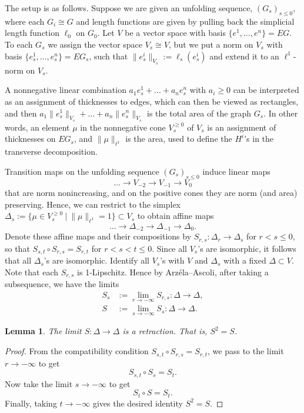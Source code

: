 \documentclass[11pt, letterpaper]{amsart}
\theoremstyle{plain}
\newtheorem{lemma}[theorem]{Lemma}
\theoremstyle{definition}
\begin{document}
The setup is as follows.
Suppose we are given an unfolding sequence, $(G_s)_{s \le 0}$, where each $G_i \cong G$ and
length functions are given by pulling back the simplicial length function
$\ell_0$ on $G_0$.
Let $V$ be a vector space with basis $\{e^1,\ldots,e^n\}=EG$.
To each $G_s$ we assign the vector space $V_s \cong V$, but we put a norm on $V_s$
with basis $\{e_s^1,\ldots,e_s^n\}=EG_s$, such that $\| e^i_s \|_{V_s}:= \ell_{s}(e^i_s)$ and extend it to an $\ell^1$-norm on
$V_s$.

A nonnegative linear combination $a_1e^{1}_s+\ldots + a_ne^{n}_s$ with $a_i \ge 0$
can be interpreted as an assignment of thicknesses to edges, which can
then be viewed as rectangles, and then
$a_1\|e^{1}_s\|_{V_s}+\ldots+a_n\|e^{n}_s\|_{V_s}$ is the total area of the graph $G_s$. In other words,
an element $\mu$ in the nonnegative cone $V_s^{\ge 0}$ of $V_s$ is an assignment of thicknesses
on $EG_s$,
and $\|\mu\|_{\ell^1}$ is the area, used to define the $H^i$'s in the transverse decomposition.

Transition maps on the unfolding sequence $(G_s)_{s\le 0}$ induce linear maps
\[
  \ldots \longrightarrow V_{-2} \longrightarrow V_{-1} \longrightarrow V_0
\]
that are norm nonincreasing, and on the positive cones they are
norm (and area) preserving.
Hence, we can restrict to the simplex $\Delta_s:=\{\mu \in V_s^{\ge 0}\ |\ \|\mu\|_{\ell^1}=1\} \subset V_s$ to obtain
affine maps
\[
  \ldots \longrightarrow \Delta_{-2} \longrightarrow \Delta_{-1} \longrightarrow \Delta_0.
\]
Denote these affine maps and their compositions by $S_{r,s}:\Delta_r \to \Delta_s$
for $r < s \le 0$,
so that $S_{s,t}\circ S_{r,s} = S_{r,t}$ for $r < s < t \le 0$. Since all $V_s$'s are isomorphic, it
follows that all $\Delta_s$'s are isomorphic. Identify all $V_s$'s with $V$ and $\Delta_s$ with a
fixed $\Delta \subset V$. Note that each $S_{r,s}$ is 1-Lipschitz. Hence by Arz{\'e}la--Ascoli, after taking a
subsequence, we have the limits
\begin{align*}
  S_s &:= \lim_{r \to -\infty} S_{r,s}:\Delta \to \Delta,\\
  S &:= \lim_{s \to -\infty} S_{s}: \Delta \to \Delta.
\end{align*}
\begin{lemma}\label{lem:S_Retraction}
  The limit $S:\Delta \to \Delta$ is a retraction. That is, $S^2=S$.
\end{lemma}
\begin{proof}
  From the compatibility condition $S_{s,t}\circ S_{r,s} = S_{r,t}$, we pass to the
  limit $r \to -\infty$ to get
  \[
    S_{s,t} \circ S_{s} = S_{t}.
  \]
  Now take the limit $s \to -\infty$ to get
  \[
    S_t \circ S = S_t.
  \]
  Finally, taking $t \to -\infty$ gives the desired identity $S^2 = S$. 
\end{proof}
\end{document}
